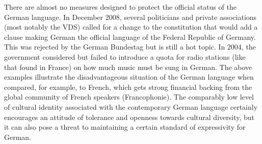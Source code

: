 \documentclass[]{../metanetpaper}
\begin{document}
There are almost no measures designed to protect the official status of the German language. In December 2008, several politicians and private associations (most notably the VDS) called for a change to the constitution that would add a clause making German the official language of the Federal Republic of Germany. This was rejected by the German Bundestag but is still a hot topic. In 2004, the government considered but failed to introduce a quota for radio stations (like that found in France) on how much music must be sung in German. 
The above examples illustrate the disadvantageous situation of the German language when compared, for example, to French, which gets strong financial backing from the global community of French speakers (Francophonie). The comparably low level of cultural identity associated with the contemporary German language certainly encourages an attitude of tolerance and openness towards cultural diversity, but it can also pose a threat to maintaining a certain standard of expressivity for German.
\end{document}
